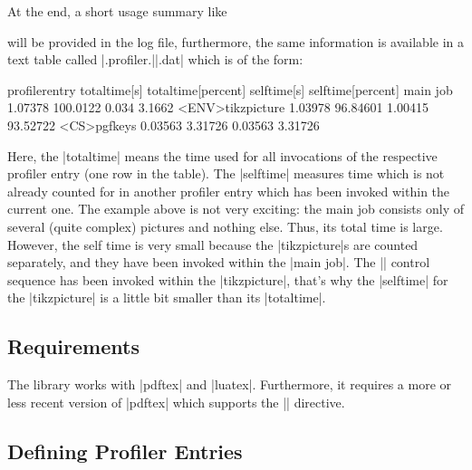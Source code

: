 At the end, a short usage summary like
%
%
\noindent will be provided in the log file, furthermore, the same information
is available in a text table called |\jobname.profiler.||.dat|
which is of the form:
%
\begin{codeexample}[code only, tikz syntax=false]
profilerentry       totaltime[s]        totaltime[percent]  selftime[s]         selftime[percent]
main job            1.07378             100.0122            0.034               3.1662
<ENV>tikzpicture    1.03978             96.84601            1.00415             93.52722
<CS>pgfkeys         0.03563             3.31726             0.03563             3.31726
\end{codeexample}
%
Here, the |totaltime| means the time used for all invocations of the respective
profiler entry (one row in the table). The |selftime| measures time which is
not already counted for in another profiler entry which has been invoked within
the current one. The example above is not very exciting: the main job consists
only of several (quite complex) pictures and nothing else. Thus, its total time
is large. However, the self time is very small because the |tikzpicture|s are
counted separately, and they have been invoked within the |main job|. The
|\pgfkeys| control sequence has been invoked within the |tikzpicture|, that's
why the |selftime| for the |tikzpicture| is a little bit smaller than its
|totaltime|.


\subsection{Requirements}

The library works with |pdftex| and |luatex|. Furthermore, it requires a more
or less recent version of |pdftex| which supports the |\pdfelapsedtime|
directive.


\subsection{Defining Profiler Entries}

